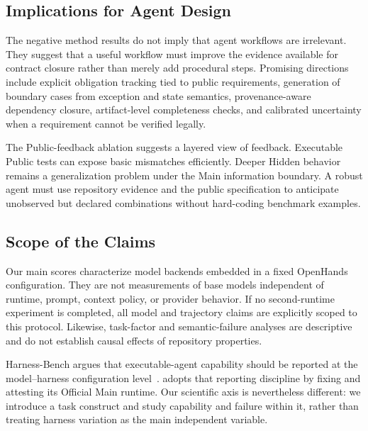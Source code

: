 \subsection{Implications for Agent Design}

The negative method results do not imply that agent workflows are irrelevant.
They suggest that a useful workflow must improve the evidence available for
contract closure rather than merely add procedural steps. Promising directions
include explicit obligation tracking tied to public requirements, generation
of boundary cases from exception and state semantics, provenance-aware
dependency closure, artifact-level completeness checks, and calibrated
uncertainty when a requirement cannot be verified legally.

The Public-feedback ablation suggests a layered view of feedback. Executable
Public tests can expose basic mismatches efficiently. Deeper Hidden behavior
remains a generalization problem under the Main information boundary. A robust
agent must use repository evidence and the public specification to anticipate
unobserved but declared combinations without hard-coding benchmark examples.

\subsection{Scope of the Claims}

Our main scores characterize model backends embedded in a fixed OpenHands
\mainprotocol configuration. They are not measurements of base models
independent of runtime, prompt, context policy, or provider behavior. If no
second-runtime experiment is completed, all model and trajectory claims are
explicitly scoped to this protocol. Likewise, task-factor and semantic-failure
analyses are descriptive and do not establish causal effects of repository
properties.

Harness-Bench argues that executable-agent capability should be reported at the
model--harness configuration level~\cite{yao2026harnessbench}. \flb adopts that
reporting discipline by fixing and attesting its Official Main runtime. Our
scientific axis is nevertheless different: we introduce a task construct and
study capability and failure within it, rather than treating harness variation
as the main independent variable.

